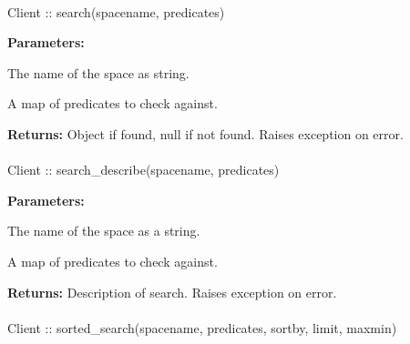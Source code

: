 \paragraph{}
\label{api:java:search}
\begin{javacode}
Client :: search(spacename, predicates)
\end{javacode}


\noindent\textbf{Parameters:}
\begin{description}[labelindent=\widthof{{\code{predicates}}},leftmargin=*,noitemsep,nolistsep,align=right]
\item[\code{spacename}] The name of the space as string.
\item[\code{predicates}] A map of predicates to check against.
\end{description}

\noindent\textbf{Returns:}
Object if found, null if not found.  Raises exception on error.

\paragraph{}
\label{api:java:search_describe}
\begin{javacode}
Client :: search_describe(spacename, predicates)
\end{javacode}


\noindent\textbf{Parameters:}
\begin{description}[labelindent=\widthof{{\code{predicates}}},leftmargin=*,noitemsep,nolistsep,align=right]
\item[\code{spacename}] The name of the space as a string.
\item[\code{predicates}] A map of predicates to check against.
\end{description}

\noindent\textbf{Returns:}
Description of search.  Raises exception on error.

\paragraph{}
\label{api:java:sorted_search}
\begin{javacode}
Client :: sorted_search(spacename, predicates, sortby, limit, maxmin)
\end{javacode}


